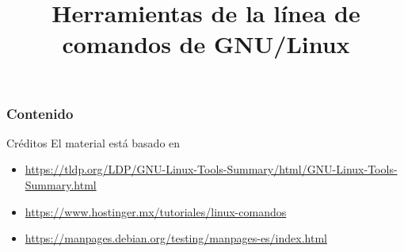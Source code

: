 \documentclass[aspectratio=169]{beamer}
\title[Línea de comandos de Linux]{Herramientas de la línea de comandos de GNU/Linux}
\newcommand{\nologo}{\setbeamertemplate{logo}{}} %
\begin{document}
{
\nologo
\begin{frame}
    \titlepage
\end{frame}
}

\begin{frame}
    \frametitle{Contenido}
    \tableofcontents
\end{frame}



\begin{frame}[c]{Créditos}
  El material está basado en
  \begin{itemize}
    \item \href{https://tldp.org/LDP/GNU-Linux-Tools-Summary/html/GNU-Linux-Tools-Summary.html}{https://tldp.org/LDP/GNU-Linux-Tools-Summary/html/GNU-Linux-Tools-Summary.html}
    \item \href{https://www.hostinger.mx/tutoriales/linux-comandos}{https://www.hostinger.mx/tutoriales/linux-comandos}
    \item \href{https://manpages.debian.org/testing/manpages-es/index.html}{https://manpages.debian.org/testing/manpages-es/index.html}
  \end{itemize}
\end{frame}
\end{document}
